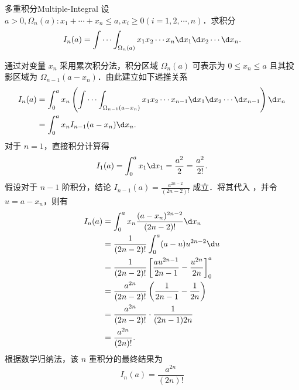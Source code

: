 \begin{problem}{多重积分}{Multiple-Integral}
    设 $a > 0, \Omega_n(a) : x_1 + \cdots + x_n \le a, x_i \ge 0 (i = 1, 2, \cdots , n)$．求积分
    \begin{equation}
        I_n(a) = \int \cdots \int_{\Omega_n(a)} x_1 x_2 \cdots x_n \d x_1 \d x_2 \cdots \d x_n.
    \end{equation}
\end{problem}

\begin{solution}
    通过对变量 $x_n$ 采用累次积分法，积分区域 $\Omega_n(a)$ 可表示为 $0 \le x_n \le a$ 且其投影区域为 $\Omega_{n-1}(a - x_n)$．由此建立如下递推关系
    \begin{equation}
        \begin{aligned}
            I_n(a) & = \int_0^a x_n \left( \int \cdots \int_{\Omega_{n-1}(a - x_n)} x_1 x_2 \cdots x_{n-1} \d x_1 \d x_2 \cdots \d x_{n-1} \right) \d x_n \\
                   & = \int_0^a x_n I_{n-1}(a - x_n) \d x_n.
        \end{aligned}
        \label{eq:recurrence}
    \end{equation}
    对于 $n=1$，直接积分计算得
    \begin{equation}
        I_1(a) = \int_0^a x_1 \d x_1 = \frac{a^2}{2} = \frac{a^2}{2!}.
    \end{equation}
    假设对于 $n-1$ 阶积分，结论 $I_{n-1}(a) = \frac{a^{2n-2}}{(2n-2)!}$ 成立．将其代入 ，并令 $u = a - x_n$，则有
    \begin{equation}
        \begin{aligned}
            I_n(a) & = \int_0^a x_n \frac{(a - x_n)^{2n-2}}{(2n-2)!} \d x_n                             \\
                   & = \frac{1}{(2n-2)!} \int_0^a (a - u) u^{2n-2} \d u                                 \\
                   & = \frac{1}{(2n-2)!} \left[ \frac{a u^{2n-1}}{2n-1} - \frac{u^{2n}}{2n} \right]_0^a \\
                   & = \frac{a^{2n}}{(2n-2)!} \left( \frac{1}{2n-1} - \frac{1}{2n} \right)              \\
                   & = \frac{a^{2n}}{(2n-2)!} \cdot \frac{1}{(2n-1)2n}                                  \\
                   & = \frac{a^{2n}}{(2n)!}.
        \end{aligned}
    \end{equation}
    根据数学归纳法，该 $n$ 重积分的最终结果为
    \begin{equation}
        \boxed{I_n(a) = \frac{a^{2n}}{(2n)!}}
    \end{equation}
\end{solution}

